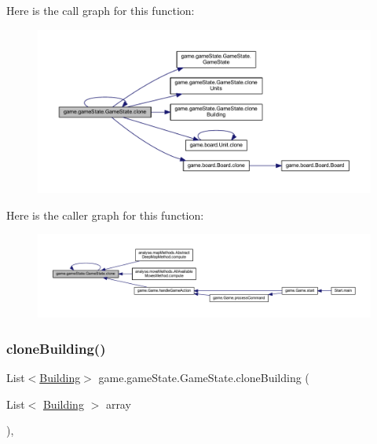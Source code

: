 Here is the call graph for this function\+:
\nopagebreak
\begin{figure}[H]
\begin{center}
\leavevmode
\includegraphics[width=350pt]{classgame_1_1game_state_1_1_game_state_acb0b76d0c2eb02659818962cd2894d3a_cgraph}
\end{center}
\end{figure}
Here is the caller graph for this function\+:
\nopagebreak
\begin{figure}[H]
\begin{center}
\leavevmode
\includegraphics[width=350pt]{classgame_1_1game_state_1_1_game_state_acb0b76d0c2eb02659818962cd2894d3a_icgraph}
\end{center}
\end{figure}
\mbox{\label{classgame_1_1game_state_1_1_game_state_a9acfa671516164070b06cb8f94be79fa}} 
\subsubsection{\texorpdfstring{clone\+Building()}{cloneBuilding()}}
{\footnotesize\ttfamily List$<$\mbox{\hyperlink{classgame_1_1board_1_1_building}{Building}}$>$ game.\+game\+State.\+Game\+State.\+clone\+Building (\begin{DoxyParamCaption}\item[{List$<$ \mbox{\hyperlink{classgame_1_1board_1_1_building}{Building}} $>$}]{array }\end{DoxyParamCaption})\hspace{0.3cm}{\ttfamily [inline]}, {\ttfamily [private]}}

